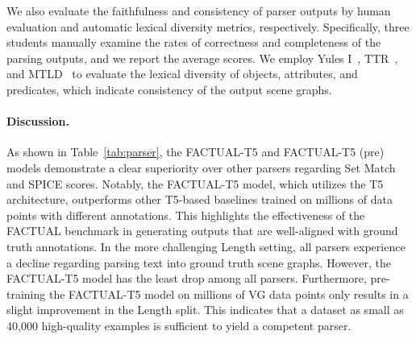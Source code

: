 We also evaluate the faithfulness and consistency of parser outputs by human evaluation and automatic lexical diversity metrics, respectively. Specifically, three students manually examine the rates of correctness and completeness of the parsing outputs, and we report the average scores. We employ Yules I~\cite{yule2014statistical}, TTR~\cite{templin1957certain}, and MTLD~\cite{koehn2005europarl} to evaluate the lexical diversity of objects, attributes, and predicates, which indicate consistency of the output scene graphs.
\paragraph{Discussion.}
\begin{table}[t]
\centering
    \caption{Intrinsic evaluation results of two metrics for various textual scene graph parsers across two test set splits.
     \vspace{-2mm} }
  \label{tab:parser}
    \vspace{-2mm}
\end{table} As shown in Table~\ref{tab:parser}, the FACTUAL-T5 and FACTUAL-T5 (pre) models demonstrate a clear superiority over other parsers regarding Set Match and SPICE scores. Notably, the FACTUAL-T5 model, which utilizes the T5 architecture, outperforms other T5-based baselines trained on millions of data points with different annotations. This highlights the effectiveness of the FACTUAL benchmark in generating outputs that are well-aligned with ground truth annotations. In the more challenging Length setting, all parsers experience a decline regarding parsing text into ground truth scene graphs. However, the FACTUAL-T5 model has the least drop among all parsers. Furthermore, pre-training the FACTUAL-T5 model on millions of VG data points only results in a slight improvement in the Length split. This indicates that a dataset as small as 40,000 high-quality examples is sufficient to yield a competent parser.

